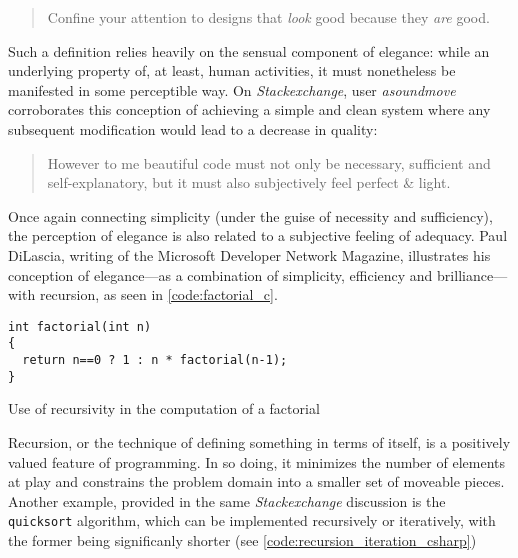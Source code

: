 \begin{quote}
  Confine your attention to designs that \emph{look} good because they \emph{are} good.\cite{mclennan_who_1997}
\end{quote}

Such a definition relies heavily on the sensual component of elegance: while an underlying property of, at least, human activities, it must nonetheless be manifested in some perceptible way. On \emph{Stackexchange}, user \emph{asoundmove} corroborates this conception of achieving a simple and clean system where any subsequent modification would lead to a decrease in quality:

\begin{quote}
  However to me beautiful code must not only be necessary, sufficient and self-explanatory, but it must also subjectively feel perfect \& light.\cite{stack_}
\end{quote}

Once again connecting simplicity (under the guise of necessity and sufficiency), the perception of elegance is also related to a subjective feeling of adequacy. Paul DiLascia, writing of the Microsoft Developer Network Magazine, illustrates his conception of elegance—as a combination of simplicity, efficiency and brilliance—with recursion\cite{dilascia_end_2019}, as seen in \ref{code:factorial_c}.

\begin{listing}
  \begin{verbatim}
int factorial(int n)
{
  return n==0 ? 1 : n * factorial(n-1);
}
\end{verbatim}
  \caption{Use of recursivity in the computation of a factorial}
  \label{code:factorial_c}
\end{listing}

Recursion, or the technique of defining something in terms of itself, is a positively valued feature of programming\cite{abelson_structure_1979}. In so doing, it minimizes the number of elements at play and constrains the problem domain into a smaller set of moveable pieces. Another example, provided in the same \emph{Stackexchange} discussion is the \lstinline{quicksort} algorithm, which can be implemented recursively or iteratively, with the former being significanly shorter (see \ref{code:recursion_iteration_csharp})

